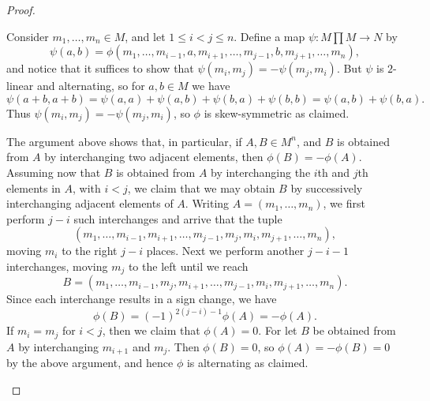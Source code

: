 \documentclass[article, a4paper, 11pt, oneside]{memoir}
\numberwithin{equation}{chapter}
\begin{document}
\begin{proof}
\begin{proofsec}
    \item[\subcref{enum:alternating-implies-skew-symmetric}]
    Consider $m_1, \ldots, m_n \in M$, and let $1 \leq i < j \leq n$. Define a map $\psi \colon M \prod M \to N$ by
    \begin{equation*}
        \psi(a, b)
            = \phi(m_1, \ldots, m_{i-1}, a, m_{i+1}, \ldots, m_{j-1}, b, m_{j+1}, \ldots, m_n),
    \end{equation*}
    and notice that it suffices to show that $\psi(m_i,m_j) = -\psi(m_j,m_i)$. But $\psi$ is $2$-linear and alternating, so for $a,b \in M$ we have
    \begin{equation*}
        \psi(a+b, a+b)
            = \psi(a,a) + \psi(a,b) + \psi(b,a) + \psi(b,b)
            = \psi(a,b) + \psi(b,a).
    \end{equation*}
    Thus $\psi(m_i,m_j) = -\psi(m_j,m_i)$, so $\phi$ is skew-symmetric as claimed.

    \item[\subcref{enum:alternating-adjacent-rows}] 
    The argument above shows that, in particular, if $A, B \in M^n$, and $B$ is obtained from $A$ by interchanging two adjacent elements, then $\phi(B) = -\phi(A)$. Assuming now that $B$ is obtained from $A$ by interchanging the $i$th and $j$th elements in $A$, with $i < j$, we claim that we may obtain $B$ by successively interchanging adjacent elements of $A$. Writing $A = (m_1, \ldots, m_n)$, we first perform $j - i$ such interchanges and arrive that the tuple
    \begin{equation*}
        (m_1, \ldots, m_{i-1}, m_{i+1}, \ldots, m_{j-1}, m_j, m_i, m_{j+1}, \ldots, m_n),
    \end{equation*}
    moving $m_i$ to the right $j - i$ places. Next we perform another $j-i-1$ interchanges, moving $m_j$ to the left until we reach
    \begin{equation*}
        B = (m_1, \ldots, m_{i-1}, m_j, m_{i+1}, \ldots, m_{j-1}, m_i, m_{j+1}, \ldots, m_n).
    \end{equation*}
    Since each interchange results in a sign change, we have
    \begin{equation*}
        \phi(B) = (-1)^{2(j-i) - 1} \phi(A) = -\phi(A).
    \end{equation*}
    If $m_i = m_j$ for $i < j$, then we claim that $\phi(A) = 0$. For let $B$ be obtained from $A$ by interchanging $m_{i+1}$ and $m_j$. Then $\phi(B) = 0$, so $\phi(A) = -\phi(B) = 0$ by the above argument, and hence $\phi$ is alternating as claimed.
    \end{proofsec}
\end{proof}
\end{document}
